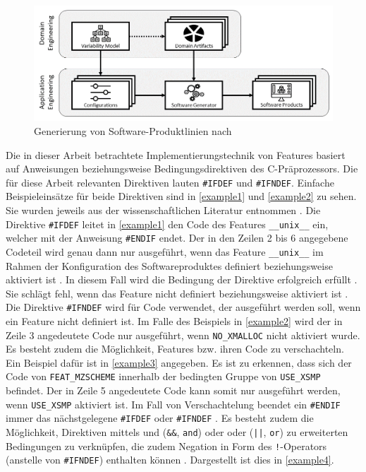 \begin{figure}[ht]
    \centering
    \includegraphics[width=\textwidth]{images/SPL}
    \caption{Generierung von Software-Produktlinien nach \cite{Thuem2014}\label{fig:spl}}
\end{figure}

Die in dieser Arbeit betrachtete Implementierungstechnik von Features basiert auf Anweisungen beziehungsweise Bedingungsdirektiven des C-Präprozessors. Die für diese Arbeit relevanten Direktiven lauten \texttt{\#IFDEF} und \texttt{\#IFNDEF}. Einfache Beispieleinsätze für beide Direktiven sind in \autoref{example1} und \autoref{example2} zu sehen. Sie wurden jeweils aus der wissenschaftlichen Literatur entnommen \cite{Medeiros2018,Preschern2019}. Die Direktive \texttt{\#IFDEF} leitet in \autoref{example1} den Code des Features \texttt{\_\_unix\_\_} ein, welcher mit der Anweisung \texttt{\#ENDIF} endet. Der in den Zeilen 2 bis 6 angegebene Codeteil wird genau dann nur ausgeführt, wenn das Feature \texttt{\_\_unix\_\_} im Rahmen der Konfiguration des Softwareproduktes definiert beziehungsweise aktiviert ist \cite{Stallmann2016}. In diesem Fall wird die Bedingung der Direktive erfolgreich erfüllt \cite{Stallmann2016}. Sie schlägt fehl, wenn das Feature nicht definiert beziehungsweise aktiviert ist \cite{Stallmann2016}. Die Direktive \texttt{\#IFNDEF} wird für Code verwendet, der ausgeführt werden soll, wenn ein Feature nicht definiert ist. Im Falle des Beispiels in \autoref{example2} wird der in Zeile 3 angedeutete Code nur ausgeführt, wenn \texttt{NO\_XMALLOC} nicht aktiviert wurde.
Es besteht zudem die Möglichkeit, Features bzw. ihren Code zu verschachteln. Ein Beispiel dafür ist in \autoref{example3} angegeben. Es ist zu erkennen, dass sich der Code von \texttt{FEAT\_MZSCHEME} innerhalb der bedingten Gruppe von \texttt{USE\_XSMP} befindet. Der in Zeile 5 angedeutete Code kann somit nur ausgeführt werden, wenn \texttt{USE\_XSMP} aktiviert ist. Im Fall von Verschachtelung beendet ein \texttt{\#ENDIF} immer das nächstgelegene \texttt{\#IFDEF} oder \texttt{\#IFNDEF} \cite{Stallmann2016}. Es besteht zudem die Möglichkeit, Direktiven mittels \glqq und\grqq{} (\texttt{\&\&}, \texttt{and}) oder \glqq oder\grqq{} (\texttt{||}, \texttt{or}) zu erweiterten Bedingungen zu verknüpfen, die zudem Negation in Form des \texttt{!}-Operators (anstelle von \texttt{\#IFNDEF}) enthalten können \cite{Stallmann2016,Queiroz2015}. Dargestellt ist dies in \autoref{example4}.

